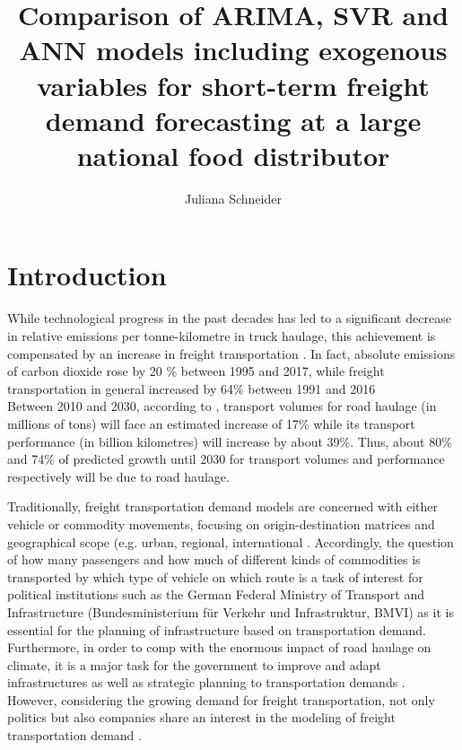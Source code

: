 \documentclass[a4paper, 11pt]{article}
\title{Comparison of ARIMA, SVR and ANN models including exogenous variables for short-term freight demand forecasting at a large national food distributor}
\author{Juliana Schneider}
\begin{document}
	
\maketitle
\section{Introduction}


While technological progress in the past decades has led to a significant decrease in relative emissions per tonne-kilometre in truck haulage, this achievement is compensated by an increase in freight transportation \citep{Umweltbundesamt.2018}. 
In fact, absolute emissions of carbon dioxide rose by 20 \% between 1995 and 2017, while freight transportation in general increased by 64\% between 1991 and 2016 \citep{.uba.2018}\\
Between 2010 and 2030, according to \cite{.bmvi}, transport volumes for road haulage (in millions of tons) will face an estimated increase of 17\% while its transport performance (in billion kilometres) will increase by about 39\%. Thus, about 80\% and 74\% of predicted growth until 2030 for transport volumes and performance respectively will be due to road haulage.\\
\newline

Traditionally, freight transportation demand models are concerned with either vehicle or commodity movements, focusing on origin-destination matrices and geographical scope (e.g. urban, regional, international \citep{Regan.2001}. 
Accordingly, the question of how many passengers and how much of different kinds of commodities is transported by which type of vehicle on which route is a task of interest for political institutions such as the German Federal Ministry of Transport and Infrastructure (Bundesministerium für Verkehr und Infrastruktur, BMVI) as it is essential for the planning of infrastructure based on transportation demand.\citep{.bmvi}\\
Furthermore, in order to comp with the enormous impact of road haulage on climate, it is a major task for the government to improve and adapt infrastructures as well as strategic planning to transportation demands \citep{BundesministeriumfurUmweltNaturschutzundnukleareSicherheit.2018}.\\

However, considering the growing demand for freight transportation, not only politics but also companies share an interest in the modeling of freight transportation demand \citep{Tsekeris.2011}.\\
\end{document}
